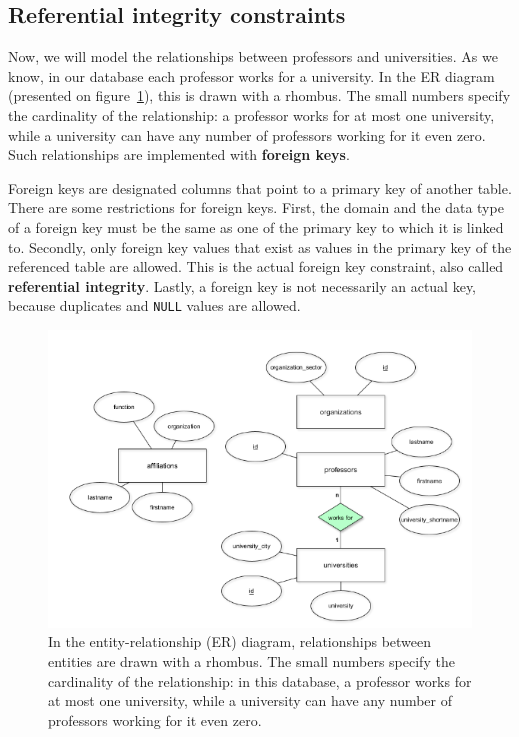 \documentclass[11pt]{article}
\begin{document}
    \subsection{Referential integrity constraints} \label{subsec:ref_integrity}

    Now, we will model the relationships between professors and universities.
    As we know, in our database each professor works for a university.
    In the ER diagram (presented on figure~\ref{fig:fk}), this is drawn with a rhombus.
    The small numbers specify the cardinality of the relationship: a professor works for at most one university, while a university can have any number of professors working for it \textemdash even zero.
    Such relationships are implemented with \textbf{foreign keys}.

    Foreign keys are designated columns that point to a primary key of another table.
    There are some restrictions for foreign keys.
    First, the domain and the data type of a foreign key must be the same as one of the primary key to which it is linked to.
    Secondly, only foreign key values that exist as values in the primary key of the referenced table are allowed.
    This is the actual foreign key constraint, also called \textbf{referential integrity}.
    Lastly, a foreign key is not necessarily an actual key, because duplicates and \texttt{NULL} values are allowed.

    \begin{figure}[hbt!]
        \centering
        \includegraphics[width=1\linewidth,trim=1 1 1 1,clip]{img/fk.png}
        \caption{In the entity-relationship (ER) diagram, relationships between entities are drawn with a rhombus.
        The small numbers specify the cardinality of the relationship: in this database, a professor works for at most one university, while a university can have any number of professors working for it \textemdash even zero.}
        \label{fig:fk}
    \end{figure}
\end{document}
